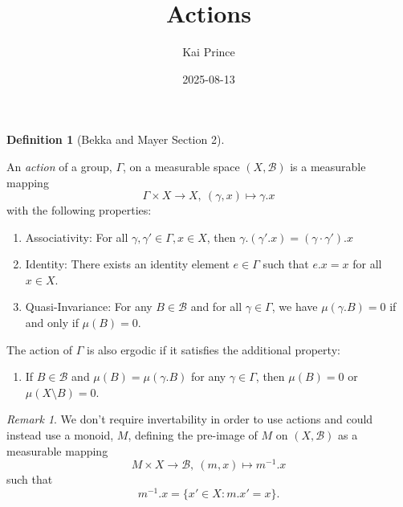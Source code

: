 \documentclass[
  british,
]{article}
\title{Actions}
\author{Kai Prince}
\date{2025-08-13}
\providecommand{\tightlist}{%
  \setlength{\itemsep}{0pt}\setlength{\parskip}{0pt}}
\renewcommand*\contentsname{Table of contents}
\newcommand\contentsname{Table of contents}
\theoremstyle{definition}
\newtheorem{definition}{Definition}[section]
\theoremstyle{remark}
\newtheorem{refremark}{Remark}[section]
\newcommand{\GroupIdentity}{{e}}
\newcommand{\Measure}{{\mu}}
\newcommand{\GroupElement}{{\gamma}}
\newcommand{\GroupAction}[2]{{#1}.{#2}}
\newcommand{\Group}{{\Gamma}}
\newcommand{\GroupActionPreImage}[2]{{#1}^{-1}.{#2}}
\newcommand{\SigmaAlgebra}[1]{{\mathscr{#1}}}
\newcommand{\MonoidElement}{{m}}
\newcommand{\Monoid}{{M}}
\newcommand{\GroupOperation}[2]{{#1}\cdot{#2}}
\begin{document}
\maketitle

\renewcommand*\contentsname{Table of contents}
{
\hypersetup{linkcolor=}
\setcounter{tocdepth}{3}
\tableofcontents
}

\begin{definition}[Bekka and Mayer
 Section
2]\protect\hypertarget{def-action}{}\label{def-action}

An \emph{action} of a group, \(\Group\), on a measurable space
\((X,\SigmaAlgebra{B})\) is a measurable mapping
\[\Group\times X\rightarrow X,\ (\GroupElement,x)\mapsto \GroupAction{\GroupElement}{x} \]
with the following properties:

\begin{enumerate}
\def\labelenumi{\arabic{enumi}.}
\tightlist
\item
  Associativity: For all
  \(\GroupElement,\GroupElement'\in \Group,x\in X\), then
  \(\GroupAction{\GroupElement}{(\GroupAction{\GroupElement'}{x})}=\GroupAction{(\GroupOperation{\GroupElement}{\GroupElement'})}{x}\)
\item
  Identity: There exists an identity element \(\GroupIdentity\in\Group\)
  such that \(\GroupAction{\GroupIdentity}{x}=x\) for all \(x\in X\).
\item
  Quasi-Invariance: For any \(B\in\SigmaAlgebra{B}\) and for all
  \(\GroupElement\in\Group\), we have
  \(\Measure(\GroupAction{\GroupElement}{B})=0\) if and only if
  \(\Measure(B)=0\).
\end{enumerate}

The action of \(\Group\) is also ergodic if it satisfies the additional
property:

\begin{enumerate}
\def\labelenumi{\arabic{enumi}.}
\setcounter{enumi}{3}
\tightlist
\item
  If \(B\in\SigmaAlgebra{B}\) and
  \(\Measure(B)=\Measure(\GroupAction{\GroupElement}{B})\) for any
  \(\GroupElement\in\Group\), then \(\Measure(B)=0\) or
  \(\Measure(X\setminus B)=0\).
\end{enumerate}

\end{definition}

\begin{refremark}
We don't require invertability in order to use actions and could instead
use a monoid, \(\Monoid\), defining the pre-image of \(\Monoid\) on
\((X,\SigmaAlgebra{B})\) as a measurable mapping
\[\Monoid\times X\rightarrow \SigmaAlgebra{B},\ (\MonoidElement,x)\mapsto \GroupActionPreImage{\MonoidElement}{x} \]
such that
\[\GroupActionPreImage{\MonoidElement}{x}=\{x'\in X: \GroupAction{\MonoidElement}{x'}=x \}. \]

\label{rem-MonoidAction}

\end{refremark}
\end{document}
